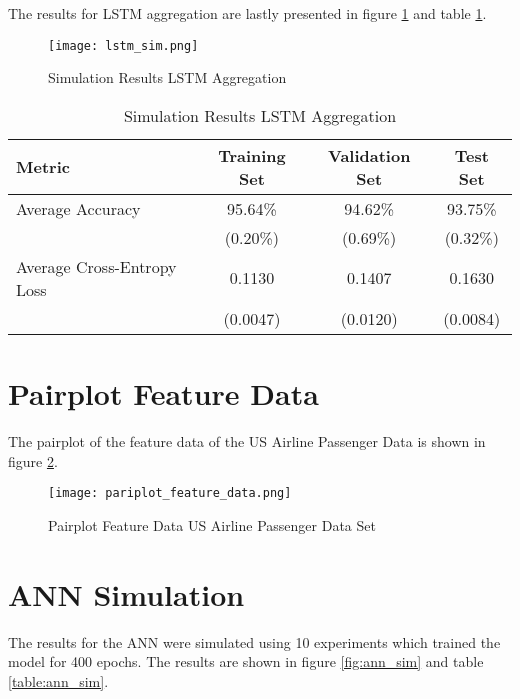   \noindent The results for LSTM aggregation are lastly presented in figure
  \ref{fig:lstm_sim} and table \ref{table:lstm_sim}. 

  \begin{figure}[h]
		\centering
		\texttt{[image: lstm\_sim.png]}
		\caption{Simulation Results LSTM Aggregation}
        \label{fig:lstm_sim}
  \end{figure}

  \begin{table}[h]
    \centering
      \begin{tabular}{|l||c|c|c|}
      \hline
      \textbf{Metric} & \textbf{Training Set} & \textbf{Validation Set} & 
      \textbf{Test Set}\\
      \hline\hline
      Average Accuracy & 95.64\% & 94.62\% & 93.75\% \\\hline 
                       & (0.20\%) & (0.69\%) & (0.32\%) \\\hline
      Average Cross-Entropy Loss & 0.1130 & 0.1407 & 0.1630 \\\hline
                                 & (0.0047) & (0.0120) & (0.0084) \\
      \hline
    \end{tabular}
    \caption{Simulation Results LSTM Aggregation}
    \label{table:lstm_sim}
  \end{table}


  \section{Pairplot Feature Data}
  \label{App:pairplot}
  
  The pairplot of the feature data of the US Airline Passenger Data is shown in
  figure \ref{fig:pairplot_feature}.

  \begin{figure}[h]
		\centering
		\texttt{[image: pariplot\_feature\_data.png]}
		\caption{Pairplot Feature Data US Airline Passenger Data Set}
        \label{fig:pairplot_feature}
  \end{figure}

  \section{ANN Simulation}
  \label{App:ann_sim}

  The results for the ANN were simulated using 10 experiments which trained the
  model for 400 epochs. The results are shown in figure \ref{fig:ann_sim} and 
  table \ref{table:ann_sim}. 

